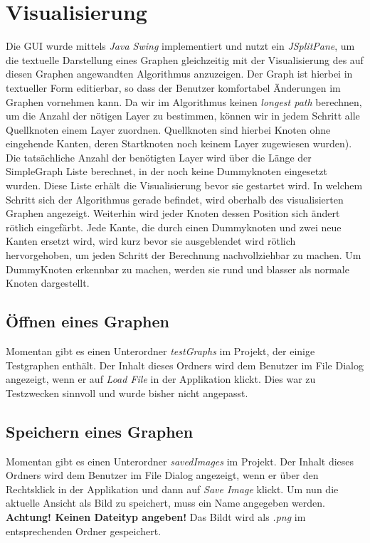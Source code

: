   \section*{Visualisierung}
Die GUI wurde mittels \textit{Java Swing} implementiert und nutzt ein \textit{JSplitPane}, um die textuelle Darstellung eines Graphen gleichzeitig mit der Visualisierung des auf diesen Graphen angewandten Algorithmus anzuzeigen. Der Graph ist hierbei in textueller Form editierbar, so dass der Benutzer komfortabel Änderungen im Graphen vornehmen kann.
\newline 
Da wir im Algorithmus keinen \textit{longest path} berechnen, um die Anzahl der nötigen Layer zu bestimmen, können wir in jedem Schritt alle Quellknoten einem Layer zuordnen. Quellknoten sind hierbei Knoten ohne eingehende Kanten, deren Startknoten noch keinem Layer zugewiesen wurden). Die tatsächliche Anzahl der benötigten Layer wird über die Länge der SimpleGraph Liste berechnet, in der noch keine Dummyknoten eingesetzt wurden. Diese Liste erhält die  Visualisierung bevor sie gestartet wird.
\newline 
In welchem Schritt sich der Algorithmus gerade befindet, wird oberhalb des visualisierten Graphen angezeigt. Weiterhin wird jeder Knoten dessen Position sich ändert rötlich eingefärbt. Jede Kante, die durch einen Dummyknoten und zwei neue Kanten ersetzt wird, wird kurz bevor sie ausgeblendet wird rötlich hervorgehoben, um jeden Schritt der Berechnung nachvollziehbar zu machen. Um DummyKnoten erkennbar zu machen, werden sie rund und blasser als normale Knoten dargestellt.

\subsection*{Öffnen eines Graphen}
Momentan gibt es einen Unterordner \textit{testGraphs} im Projekt, der einige Testgraphen enthält. Der Inhalt dieses Ordners wird dem Benutzer im File Dialog angezeigt, wenn er auf \textit{Load File} in der Applikation klickt. Dies war zu Testzwecken sinnvoll und wurde bisher nicht angepasst.


\subsection*{Speichern eines Graphen}
Momentan gibt es einen Unterordner \textit{savedImages} im Projekt. Der Inhalt dieses Ordners wird dem Benutzer im File Dialog angezeigt, wenn er über den Rechtsklick in der Applikation und dann auf \textit{Save Image} klickt. Um nun die aktuelle Ansicht als Bild zu speichert, muss ein Name angegeben werden. \textbf{Achtung! Keinen Dateityp angeben!} Das Bildt wird als \textit{.png} im entsprechenden Ordner gespeichert.




